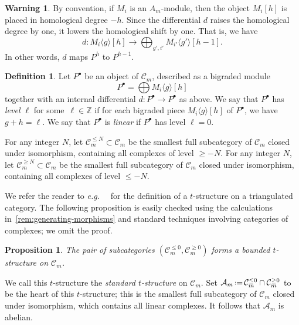 \documentclass{amsart}
\newtheorem{proposition}[theorem]{Proposition}
\theoremstyle{definition}
\newtheorem{definition}[theorem]{Definition}
\newtheorem{warning}[theorem]{Warning}
\newcommand{\eqdef}{\mbox{\,\raisebox{0.2ex}{\scriptsize\ensuremath{\mathrm:}}\ensuremath{=}\,}} %
\newcommand{\eg}{\textit{e.g.}~} %
\newcommand{\darkblue}{\color{darkblue}} %
\newcommand{\defn}[1]{\textsl{\darkblue #1}} %
\begin{document}
\begin{warning}
  By convention, if \(M_i\) is an \(A_m\)-module, then the object \(M_i[h]\) is placed in homological degree \(-h\).
  Since the differential \(d\) raises the homological degree by one, it lowers the homological shift by one.
  That is, we have
  \[d \colon M_i\langle g \rangle[h] \to \bigoplus_{g',i'} M_{i'}\langle g' \rangle[h-1].\]
  In other words, \(d\) maps \(P^h\) to \(P^{h-1}\).
\end{warning}

\begin{definition}
\label{def:linear-complex}
Let \(P^{\bullet}\) be an object of \(\mathcal{C}_m\), described as a bigraded module
\[
P^{\bullet} = \bigoplus M_i\langle g \rangle[h]
\]
together with an internal differential \(d \colon P^{\bullet} \to P^{\bullet}\) as above.
We say that \(P^{\bullet}\) has \defn{level \(\ell\)} for some~\(\ell \in \mathbb{Z}\) if for each bigraded piece \(M_i \langle g \rangle[h]\) of \(P^{\bullet}\), we have \(g + h = \ell\).
We say that \(P^{\bullet}\) is \defn{linear} if \(P^{\bullet}\) has level \(\ell = 0\).
\end{definition}

For any integer \(N\), let \(\mathcal{C}_m^{\le N} \subset \mathcal{C}_m\) be the smallest full subcategory of \(\mathcal{C}_m\) closed under isomorphism, containing all complexes of level \(\geq -N\).
For any integer \(N\), let \(\mathcal{C}_m^{\geq N} \subset \mathcal{C}_m\) be the smallest full subcategory of \(\mathcal{C}_m\) closed under isomorphism, containing all complexes of level \(\leq -N\).

We refer the reader to \eg~\cite[Sect.~1.3]{bel.ber.del:82} for the definition of a \(t\)-structure on a triangulated category.
The following proposition is easily checked using the calculations in~\cref{rem:generating-morphisms} and standard techniques involving categories of complexes; we omit the proof.

\begin{proposition}
The pair of subcategories \((\mathcal{C}_m^{\leq 0}, \mathcal{C}_m^{\geq 0})\) forms a bounded \(t\)-structure on \(\mathcal{C}_m\).
\end{proposition}

We call this \(t\)-structure the \defn{standard \(t\)-structure} on \(\mathcal{C}_m\).
Set \(\mathcal{A}_m \eqdef \mathcal{C}^{\leq 0}_m \cap \mathcal{C}_m^{\geq 0}\) to be the heart of this \(t\)-structure; this is the smallest full subcategory of \(\mathcal{C}_m\) closed under isomorphism, which contains all linear complexes.
It follows that \(\mathcal{A}_m\) is abelian.
\end{document}
